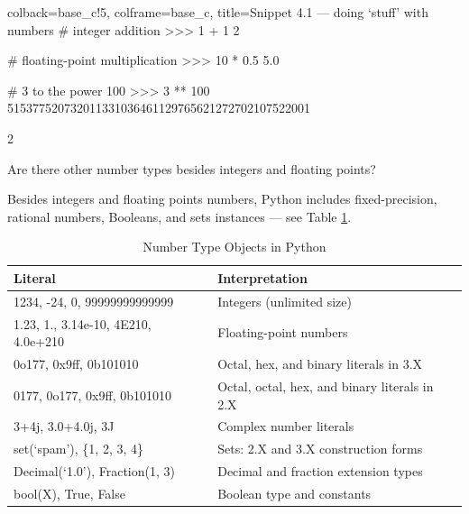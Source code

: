 \documentclass[a4paper,11pt]{book}
\newcommand{\question}[1]{%
    \begin{tcolorbox}[colback=comp_c!10,colframe=comp_c,sidebyside align=top,width=\linewidth,before skip=1ex]
        #1
    \end{tcolorbox}
    \switchcolumn%
}
\newcommand{\note}[1]{%
    \begin{tcolorbox}[colback=white!0,colframe=white!10,width=\linewidth,before skip=1ex]
        #1
    \end{tcolorbox}
}
\begin{document}
\begin{pythoncode}[linenos=true,]{colback=base_c!5, colframe=base_c, title=\sffamily Snippet 4.1 --- doing `stuff' with numbers}
# integer addition
>>> 1 + 1
2

# floating-point multiplication
>>> 10 * 0.5
5.0

# 3 to the power 100
>>> 3 ** 100
515377520732011331036461129765621272702107522001

\end{pythoncode}

\begin{paracol}{2}
	\question{\raggedright Are there other number types besides integers and floating points?}
    \note{Besides integers and floating points numbers, Python includes fixed-precision, rational numbers, Booleans, and sets instances --- see Table \ref{tab:number_types_in_python}.}
\end{paracol}

\begin{table}[!htbp]
	\centering
	\caption{Number Type Objects in Python}
	\label{tab:number_types_in_python}
	\begin{tabular}{ll}
		\toprule \toprule
		Literal & Interpretation\\
		\midrule
		 1234, -24, 0, 99999999999999 & Integers (unlimited size)\\
		 1.23, 1., 3.14e-10, 4E210, 4.0e+210 & Floating-point numbers \\
		 0o177, 0x9ff, 0b101010 & Octal, hex, and binary literals in 3.X \\
		 0177, 0o177, 0x9ff, 0b101010 & Octal, octal, hex, and binary literals in 2.X \\
		 3+4j, 3.0+4.0j, 3J & Complex number literals \\
		 set(`spam'), \{1, 2, 3, 4\} & Sets: 2.X and 3.X construction forms\\ Decimal(`1.0'), Fraction(1, 3) & Decimal and fraction extension types\\
		 bool(X), True, False & Boolean type and constants\\
		 \bottomrule
	\end{tabular}
\end{table}
\clearpage
\end{document}
